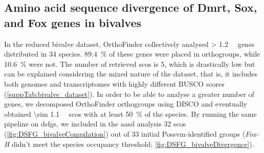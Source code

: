 \subsection{Amino acid sequence divergence of Dmrt, Sox, and Fox genes in bivalves}
In the reduced bivalve dataset, OrthoFinder collectively analysed \qty{> 1.2}{\mega\nothing} genes distributed in 34 species. \qty{89.4}{\percent} of these genes were placed in orthogroups, while \qty{10.6}{\percent} were not. The number of retrieved \glspl{sco} is 5, which is drastically low but can be explained considering the mixed nature of the dataset, that is, it includes both genomes and transcriptomes with highly different BUSCO scores (\cref{suppTab:bivalve_dataset}). In order to be able to analyse a greater number of genes, we decomposed OrthoFinder orthogroups using DISCO and eventually obtained \qty{\sim 1.1}{\kilo\nothing} \glspl{sco} with at least \qty{50}{\percent} of the species. By running the same pipeline on \glspl{dsfg}, we included in the \gls{aasd} analysis 32 \glspl{sco} (\cref{fig:DSFG_bivalveCompilation}) out of 33 initial Possvm-identified groups (\textit{Fox-H} didn’t meet the species occupancy threshold; \cref{fig:DSFG_bivalveDivergence}).


